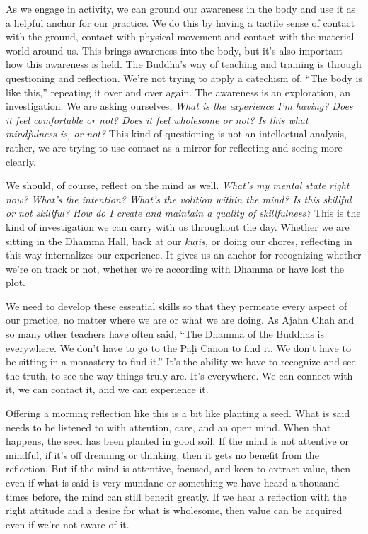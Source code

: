 
As we engage in activity, we can ground our awareness in the body and 
use it as a helpful anchor for our practice. We do this by having a 
tactile sense of contact with the ground, contact with physical 
movement and contact with the material world around us. This brings 
awareness into the body, but it's also important how this awareness is 
held. The Buddha's way of teaching and training is through questioning 
and reflection. We're not trying to apply a catechism of, ``The body is 
like this,'' repeating it over and over again. The awareness is an 
exploration, an investigation. We are asking ourselves, \emph{What is 
the experience I'm having? Does it feel comfortable or not? Does it 
feel wholesome or not? Is this what mindfulness is, or not?} This kind 
of questioning is not an intellectual analysis, rather, we are trying 
to use contact as a mirror for reflecting and seeing more clearly.

We should, of course, reflect on the mind as well. \emph{What's my 
mental state right now? What's the intention? What's the volition 
within the mind? Is this skillful or not skillful? How do I create and 
maintain a quality of skillfulness?} This is the kind of investigation 
we can carry with us throughout the day. Whether we are sitting in the 
Dhamma Hall, back at our \emph{kuṭis,} or doing our chores, 
reflecting in this way internalizes our experience. It gives us an 
anchor for recognizing whether we're on track or not, whether we're 
according with Dhamma or have lost the plot.

We need to develop these essential skills so that they permeate every 
aspect of our practice, no matter where we are or what we are doing. As 
Ajahn Chah and so many other teachers have often said, ``The Dhamma of 
the Buddhas is everywhere. We don't have to go to the Pāḷi Canon to 
find it. We don't have to be sitting in a monastery to find it.'' It's 
the ability we have to recognize and see the truth, to see the way 
things truly are. It's everywhere. We can connect with it, we can 
contact it, and we can experience it.


Offering a morning reflection like this is a bit like planting a seed. 
What is said needs to be listened to with attention, care, and an open 
mind. When that happens, the seed has been planted in good soil. If the 
mind is not attentive or mindful, if it's off dreaming or thinking, 
then it gets no benefit from the reflection. But if the mind is 
attentive, focused, and keen to extract value, then even if what is 
said is very mundane or something we have heard a thousand times 
before, the mind can still benefit greatly. If we hear a reflection 
with the right attitude and a desire for what is wholesome, then value 
can be acquired even if we're not aware of it.

